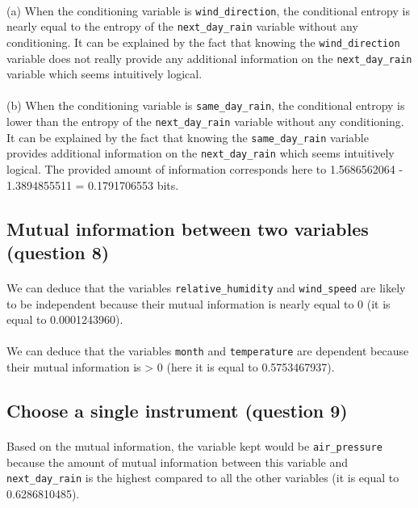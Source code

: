\documentclass[a4paper, 11pt, oneside]{article}
\begin{document}
\paragraph{}(a) When the conditioning variable is \texttt{wind\_direction}, the conditional entropy is nearly equal to the entropy of the \texttt{next\_day\_rain} variable without any conditioning.
It can be explained by the fact that knowing the \texttt{wind\_direction} variable does not really provide any additional information on the \texttt{next\_day\_rain} variable which seems intuitively logical.

\paragraph{}(b) When the conditioning variable is \texttt{same\_day\_rain}, the conditional entropy is lower than the entropy of the \texttt{next\_day\_rain} variable without any conditioning.
It can be explained by the fact that knowing the \texttt{same\_day\_rain} variable provides additional information on the \texttt{next\_day\_rain} which seems intuitively logical. The provided amount of information corresponds here to 1.5686562064 - 1.3894855511 = 0.1791706553 bits.

\subsection{Mutual information between two variables (question 8)} 

\paragraph{}We can deduce that the variables \texttt{relative\_humidity} and \texttt{wind\_speed} are likely to be independent because their mutual information is nearly equal to 0 (it is equal to 0.0001243960). 

\paragraph{}We can deduce that the variables \texttt{month} and \texttt{temperature} are dependent because their mutual information is > 0 (here it is equal to 0.5753467937).

\subsection{Choose a single instrument (question 9)}

\paragraph{}Based on the mutual information, the variable kept would be \texttt{air\_pressure} because the amount of mutual information between this variable and \texttt{next\_day\_rain} is the highest compared to all the other variables (it is equal to 0.6286810485).
\end{document}
